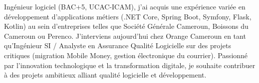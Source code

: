 %
%
%

\par{
	Ingénieur logiciel (BAC+5, UCAC-ICAM), j'ai acquis une expérience variée en développement d'applications métiers (.NET Core, Spring Boot, Symfony, Flask, Kotlin) au sein d'entreprises telles que Société Générale Cameroun, Boissons du Cameroun ou Perenco. J'interviens aujourd'hui chez Orange Cameroun en tant qu'Ingénieur SI / Analyste en Assurance Qualité Logicielle sur des projets critiques (migration Mobile Money, gestion électronique du courrier). Passionné par l'innovation technologique et la transformation digitale, je souhaite contribuer à des projets ambitieux alliant qualité logicielle et développement.
}
